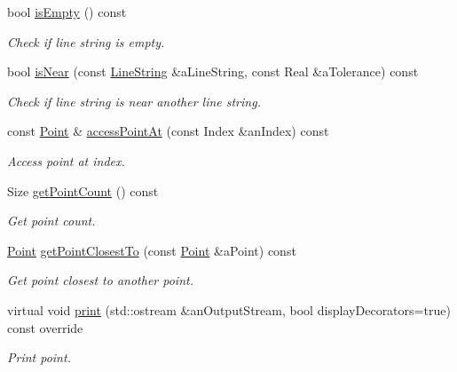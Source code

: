 \begin{DoxyCompactItemize}
bool \hyperlink{classlibrary_1_1math_1_1geom_1_1d3_1_1objects_1_1_line_string_a33e1e2dfcd7352eb41b6991bd97ec6cd}{is\+Empty} () const
\begin{DoxyCompactList}\small\item\em Check if line string is empty. \end{DoxyCompactList}\item 
bool \hyperlink{classlibrary_1_1math_1_1geom_1_1d3_1_1objects_1_1_line_string_acbfb3f1c542793b9fa810ba8626633c4}{is\+Near} (const \hyperlink{classlibrary_1_1math_1_1geom_1_1d3_1_1objects_1_1_line_string}{Line\+String} \&a\+Line\+String, const Real \&a\+Tolerance) const
\begin{DoxyCompactList}\small\item\em Check if line string is near another line string. \end{DoxyCompactList}\item 
const \hyperlink{classlibrary_1_1math_1_1geom_1_1d3_1_1objects_1_1_point}{Point} \& \hyperlink{classlibrary_1_1math_1_1geom_1_1d3_1_1objects_1_1_line_string_a10bafe20bf12505dfe7dfb9c83ce1613}{access\+Point\+At} (const Index \&an\+Index) const
\begin{DoxyCompactList}\small\item\em Access point at index. \end{DoxyCompactList}\item 
Size \hyperlink{classlibrary_1_1math_1_1geom_1_1d3_1_1objects_1_1_line_string_ac635c796406d38f6f1019b64cab9b42c}{get\+Point\+Count} () const
\begin{DoxyCompactList}\small\item\em Get point count. \end{DoxyCompactList}\item 
\hyperlink{classlibrary_1_1math_1_1geom_1_1d3_1_1objects_1_1_point}{Point} \hyperlink{classlibrary_1_1math_1_1geom_1_1d3_1_1objects_1_1_line_string_a39cf8a2be15c3f1686ed855659ded104}{get\+Point\+Closest\+To} (const \hyperlink{classlibrary_1_1math_1_1geom_1_1d3_1_1objects_1_1_point}{Point} \&a\+Point) const
\begin{DoxyCompactList}\small\item\em Get point closest to another point. \end{DoxyCompactList}\item 
virtual void \hyperlink{classlibrary_1_1math_1_1geom_1_1d3_1_1objects_1_1_line_string_a289414dbfc4ff32520f546c8a435170f}{print} (std\+::ostream \&an\+Output\+Stream, bool display\+Decorators=true) const override
\begin{DoxyCompactList}\small\item\em Print point. \end{DoxyCompactList}\item 

\end{DoxyCompactItemize}
